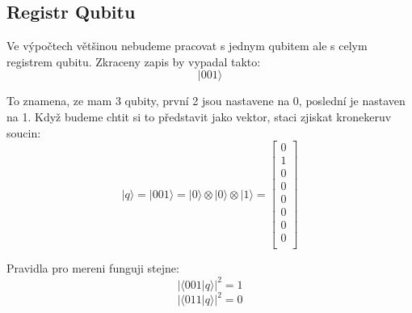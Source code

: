 \documentclass[11pt]{article}
\begin{document}
\subsection{Registr Qubitu}
Ve výpočtech většinou nebudeme pracovat s jednym qubitem ale s celym registrem qubitu. Zkraceny zapis by vypadal takto:
$$|001\rangle$$
\par To znamena, ze mam 3 qubity, první 2 jsou nastavene na 0, poslední je nastaven na 1.
Když budeme chtit si to představit jako vektor, staci zjiskat kronekeruv soucin:
$$|q\rangle = |001\rangle = |0\rangle \otimes |0\rangle \otimes |1\rangle = \begin{bmatrix}
        0 \\
        1 \\
        0 \\
        0 \\
        0 \\
        0 \\
        0 \\
        0 \\
    \end{bmatrix}$$
\par Pravidla pro mereni funguji stejne:
$$|\langle001|q\rangle|^2 = 1$$
$$|\langle 011|q\rangle|^2 = 0$$
\end{document}
